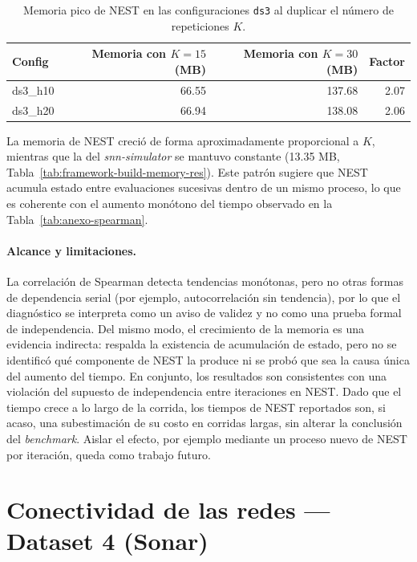 \begin{table}[htbp]
\centering
\small
\caption{Memoria pico de NEST en las configuraciones \texttt{ds3} al duplicar el número de repeticiones $K$.}
\label{tab:anexo-nest-memoria}
\begin{tabular}{lrrr}
\toprule
Config & Memoria con $K=15$ (MB) & Memoria con $K=30$ (MB) & Factor \\
\midrule
ds3\_h10 & 66.55 & 137.68 & 2.07 \\
ds3\_h20 & 66.94 & 138.08 & 2.06 \\
\bottomrule
\end{tabular}
\end{table}

La memoria de NEST creció de forma aproximadamente proporcional a $K$, mientras que la del \textit{snn-simulator} se mantuvo constante (13.35 MB, Tabla~\ref{tab:framework-build-memory-res}). Este patrón sugiere que NEST acumula estado entre evaluaciones sucesivas dentro de un mismo proceso, lo que es coherente con el aumento monótono del tiempo observado en la Tabla~\ref{tab:anexo-spearman}.

\paragraph{Alcance y limitaciones.} La correlación de Spearman detecta tendencias monótonas, pero no otras formas de dependencia serial (por ejemplo, autocorrelación sin tendencia), por lo que el diagnóstico se interpreta como un aviso de validez y no como una prueba formal de independencia. Del mismo modo, el crecimiento de la memoria es una evidencia indirecta: respalda la existencia de acumulación de estado, pero no se identificó qué componente de NEST la produce ni se probó que sea la causa única del aumento del tiempo. En conjunto, los resultados son consistentes con una violación del supuesto de independencia entre iteraciones en NEST. Dado que el tiempo crece a lo largo de la corrida, los tiempos de NEST reportados son, si acaso, una subestimación de su costo en corridas largas, sin alterar la conclusión del \textit{benchmark}. Aislar el efecto, por ejemplo mediante un proceso nuevo de NEST por iteración, queda como trabajo futuro.

\section{Conectividad de las redes --- Dataset 4 (Sonar)}
\label{sec:anexo-conectividad-ds4}

